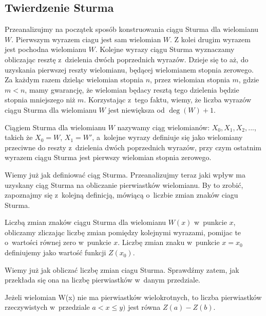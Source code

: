 \subsection{Twierdzenie Sturma}

Przeanalizujmy na początek sposób konstruowania ciągu Sturma dla wielomianu $W$. Pierwszym wyrazem ciagu jest sam wielomian $W$. Z kolei drugim wyrazem jest pochodna wielomianu $W$. Kolejne wyrazy ciągu Sturma wyznaczamy obliczając resztę z~dzielenia dwóch poprzednich wyrazów. Dzieje się to aż, do uzyskania pierwszej reszty wielomianu, będącej wielomianem stopnia zerowego. Za każdym razem dzieląc wielomian stopnia $n$, przez wielomian stopnia $m$, gdzie $m<n$, mamy gwarancję, że wielomian będacy resztą tego dzielenia będzie stopnia mniejszego niż $m$. Korzystając z~tego faktu, wiemy, że liczba wyrazów ciągu Sturma dla wielomianu $W$ jest niewiększa od $\deg(W)+1$.

\begin{definition}
	$ $ \\
	Ciągiem Sturma dla wielomianu $W$ nazywamy ciąg wielomianów: $X_0, X_1, X_2,...$, takich że $X_0=W$, $X_1=W'$, a~kolejne wyrazy definiuje się jako wielomiany przeciwne do reszty z~dzielenia dwóch poprzednich wyrazów, przy czym ostatnim wyrazem ciągu Sturma jest pierwszy wielomian stopnia zerowego. 
\end{definition}

Wiemy już jak definiować ciąg Sturma. Przeanalizujmy teraz jaki wpływ ma uzyskany ciąg Sturma na obliczanie pierwiastków wielomianu. By to zrobić, zapoznajmy się z~kolejną definicją, mówiącą o~liczbie zmian znaków ciagu Sturma.

\begin{definition}
	$ $ \\
	Liczbą zmian znaków ciągu Sturma dla wielomianu $W(x)$ w~punkcie $x$, obliczamy zliczając liczbę zmian pomiędzy kolejnymi wyrazami, pomijac te o~wartości równej zero w~punkcie $x$. Liczbę zmian znaku w~punkcie $x=x_0$ definiujemy jako wartość funkcji $Z(x_0)$.
\end{definition}

Wiemy już jak obliczać liczbę zmian ciagu Sturma. Sprawdźmy zatem, jak przekłada się ona na liczbę pierwiastków w~danym przedziale.

\begin{theorem}
	$ $ \\
	Jeżeli wielomian W(x) nie ma pierwiastków wielokrotnych, to liczba pierwiastków rzeczywistych w~przedziale $a<x\le y)$ jest równa $Z(a) - Z(b)$.
\end{theorem}


